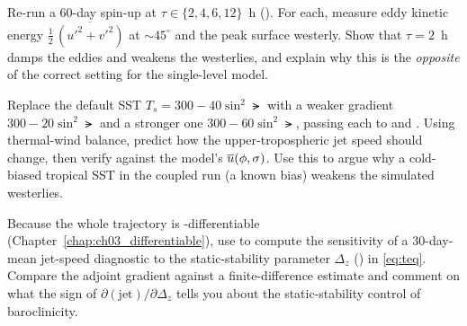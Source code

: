 \begin{exercise}
Re-run a $60$-day spin-up at $\tau \in \{2,4,6,12\}$~h
(). For each, measure eddy kinetic energy
$\tfrac{1}{2}\,\overline{(u'^2+v'^2)}$ at $\sim 45^\circ$ and the peak surface
westerly. Show that $\tau=2$~h damps the eddies and weakens the westerlies, and
explain why this is the \emph{opposite} of the correct setting for the
single-level model.
\end{exercise}

\begin{exercise}
Replace the default SST $T_s = 300 - 40\sin^2\lat$ with a weaker gradient
$300 - 20\sin^2\lat$ and a stronger one $300 - 60\sin^2\lat$, passing each to
 and . Using thermal-wind balance, predict how the
upper-tropospheric jet speed should change, then verify against the model's
$\overline{u}(\phi,\sigma)$. Use this to argue why a cold-biased tropical SST in
the coupled run (a known \model{} bias) weakens the simulated westerlies.
\end{exercise}

\begin{exercise}
Because the whole trajectory is \jax{}-differentiable
(Chapter~\ref{chap:ch03_differentiable}), use  to compute the
sensitivity of a $30$-day-mean jet-speed diagnostic to the static-stability
parameter $\Delta_z$ () in \eqref{eq:teq}. Compare the adjoint gradient
against a finite-difference estimate and comment on what the sign of
$\partial(\text{jet})/\partial\Delta_z$ tells you about the static-stability
control of baroclinicity.
\end{exercise}
